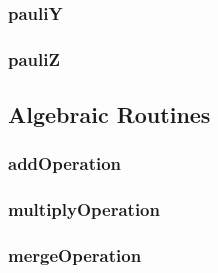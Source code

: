 \documentclass[10pt]{book}
\begin{document}
\subsubsection{\textbf{pauliY}}\label{subsec:pauliy}


\subsubsection{\textbf{pauliZ}}\label{subsec:pauliz}



\subsection{Algebraic Routines}
\subsubsection{\textbf{addOperation}}\label{subsec:addop}


\subsubsection{\textbf{multiplyOperation}}\label{subsec:mulop}


\subsubsection{\textbf{mergeOperation}}\label{subsec:mergeop}



\clearpage




\end{document}
